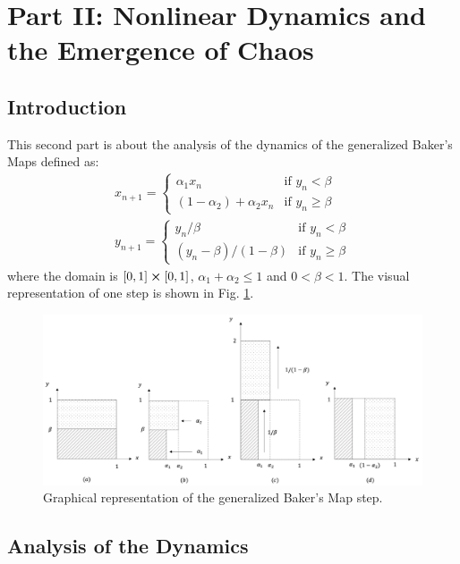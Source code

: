 \documentclass[11pt,titlepage]{article}
\begin{document}
\section{Part II: Nonlinear Dynamics and the Emergence of Chaos}


\subsection{Introduction} %
This second part is about the analysis of the dynamics of the generalized Baker's Maps defined as:
\begin{equation} \label{eq_map}
	\begin{gathered}
		x_{n+1} = 
		\begin{cases}
			\alpha_1 x_n & \text{if } y_n < \beta \\
			(1-\alpha_2) + \alpha_2 x_n & \text{if } y_n \ge \beta
		\end{cases}
	\\
	y_{n+1} = 
	\begin{cases}
		y_n/\beta & \text{if } y_n < \beta \\
		(y_n -\beta)/(1-\beta) & \text{if } y_n \ge \beta
	\end{cases}
	\end{gathered}
\end{equation}
where the domain is $[0,1] \cross [0,1]$, $\alpha_1 + \alpha_2\le 1$ and $0<\beta<1$. The visual representation of one step is shown in Fig.  \ref{fig14}.
\begin{center}
	\begin{figure} [h]
		\centering
		\includegraphics[width = 6in]{./figures/baker_map.png}
		\caption{Graphical representation of the generalized Baker's Map step.}
		\label{fig14}
	\end{figure}
\end{center}
\subsection{Analysis of the Dynamics}
\end{document}
